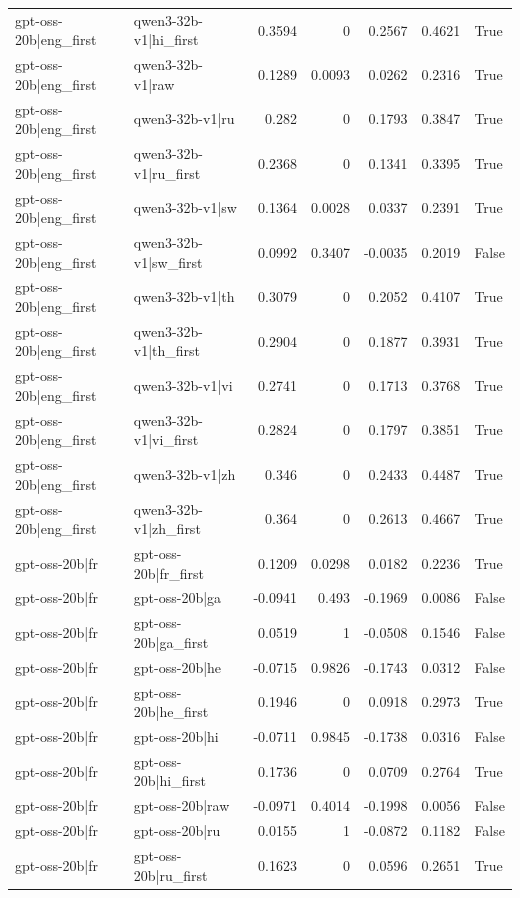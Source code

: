 \begin{table}
\begin{tabular}{l l r r r r l}
gpt-oss-20b|eng_first & qwen3-32b-v1|hi_first & 0.3594 & 0 & 0.2567 & 0.4621 & True \\
gpt-oss-20b|eng_first & qwen3-32b-v1|raw & 0.1289 & 0.0093 & 0.0262 & 0.2316 & True \\
gpt-oss-20b|eng_first & qwen3-32b-v1|ru & 0.282 & 0 & 0.1793 & 0.3847 & True \\
gpt-oss-20b|eng_first & qwen3-32b-v1|ru_first & 0.2368 & 0 & 0.1341 & 0.3395 & True \\
gpt-oss-20b|eng_first & qwen3-32b-v1|sw & 0.1364 & 0.0028 & 0.0337 & 0.2391 & True \\
gpt-oss-20b|eng_first & qwen3-32b-v1|sw_first & 0.0992 & 0.3407 & -0.0035 & 0.2019 & False \\
gpt-oss-20b|eng_first & qwen3-32b-v1|th & 0.3079 & 0 & 0.2052 & 0.4107 & True \\
gpt-oss-20b|eng_first & qwen3-32b-v1|th_first & 0.2904 & 0 & 0.1877 & 0.3931 & True \\
gpt-oss-20b|eng_first & qwen3-32b-v1|vi & 0.2741 & 0 & 0.1713 & 0.3768 & True \\
gpt-oss-20b|eng_first & qwen3-32b-v1|vi_first & 0.2824 & 0 & 0.1797 & 0.3851 & True \\
gpt-oss-20b|eng_first & qwen3-32b-v1|zh & 0.346 & 0 & 0.2433 & 0.4487 & True \\
gpt-oss-20b|eng_first & qwen3-32b-v1|zh_first & 0.364 & 0 & 0.2613 & 0.4667 & True \\
gpt-oss-20b|fr & gpt-oss-20b|fr_first & 0.1209 & 0.0298 & 0.0182 & 0.2236 & True \\
gpt-oss-20b|fr & gpt-oss-20b|ga & -0.0941 & 0.493 & -0.1969 & 0.0086 & False \\
gpt-oss-20b|fr & gpt-oss-20b|ga_first & 0.0519 & 1 & -0.0508 & 0.1546 & False \\
gpt-oss-20b|fr & gpt-oss-20b|he & -0.0715 & 0.9826 & -0.1743 & 0.0312 & False \\
gpt-oss-20b|fr & gpt-oss-20b|he_first & 0.1946 & 0 & 0.0918 & 0.2973 & True \\
gpt-oss-20b|fr & gpt-oss-20b|hi & -0.0711 & 0.9845 & -0.1738 & 0.0316 & False \\
gpt-oss-20b|fr & gpt-oss-20b|hi_first & 0.1736 & 0 & 0.0709 & 0.2764 & True \\
gpt-oss-20b|fr & gpt-oss-20b|raw & -0.0971 & 0.4014 & -0.1998 & 0.0056 & False \\
gpt-oss-20b|fr & gpt-oss-20b|ru & 0.0155 & 1 & -0.0872 & 0.1182 & False \\
gpt-oss-20b|fr & gpt-oss-20b|ru_first & 0.1623 & 0 & 0.0596 & 0.2651 & True \\

\end{tabular}
\end{table}
